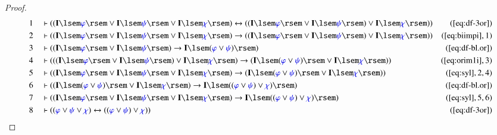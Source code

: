 \begin{proof}
\begin{align}
  1 &&  & \vdash ( ( \mathbf{I} \lsem \mw{\varphi} \rsem \vee \mathbf{I}
      \lsem \mw{\psi} \rsem \vee \mathbf{I} \lsem \mw{\chi} \rsem )
      \leftrightarrow ( ( \mathbf{I} \lsem \mw{\varphi} \rsem \vee
      \mathbf{I} \lsem \mw{\psi} \rsem ) \vee \mathbf{I} \lsem \mw{\chi}
      \rsem ) )&(\mbox{\ref{eq:df-3or}})\notag
  \\ 2 &&  & \vdash ( ( \mathbf{I} \lsem \mw{\varphi} \rsem \vee
      \mathbf{I} \lsem \mw{\psi} \rsem \vee \mathbf{I} \lsem \mw{\chi}
      \rsem ) \rightarrow ( ( \mathbf{I} \lsem \mw{\varphi} \rsem \vee
      \mathbf{I} \lsem \mw{\psi} \rsem ) \vee \mathbf{I} \lsem
      \mw{\chi} \rsem ) )&(\mbox{\ref{eq:biimpi}},1)\notag
  \\ 3 &&  & \vdash ( ( \mathbf{I} \lsem \mw{\varphi} \rsem \vee
      \mathbf{I} \lsem \mw{\psi} \rsem ) \rightarrow \mathbf{I} \lsem (
      \mw{\varphi} \vee \mw{\psi} ) \rsem
      )&(\mbox{\ref{eq:df-bl.or}})\notag
  \\ 4 &&  & \vdash ( ( ( \mathbf{I} \lsem \mw{\varphi} \rsem \vee
      \mathbf{I} \lsem \mw{\psi} \rsem ) \vee \mathbf{I} \lsem
      \mw{\chi} \rsem ) \rightarrow ( \mathbf{I} \lsem ( \mw{\varphi}
      \vee \mw{\psi} ) \rsem \vee \mathbf{I} \lsem \mw{\chi} \rsem )
      )&(\mbox{\ref{eq:orim1i}},3)\notag
  \\ 5 &&  & \vdash ( ( \mathbf{I} \lsem \mw{\varphi} \rsem \vee
      \mathbf{I} \lsem \mw{\psi} \rsem \vee \mathbf{I} \lsem \mw{\chi}
      \rsem ) \rightarrow ( \mathbf{I} \lsem ( \mw{\varphi} \vee
      \mw{\psi} ) \rsem \vee \mathbf{I} \lsem \mw{\chi} \rsem )
      )&(\mbox{\ref{eq:syl}},2,4)\notag
  \\ 6 &&  & \vdash ( ( \mathbf{I} \lsem ( \mw{\varphi} \vee \mw{\psi}
      ) \rsem \vee \mathbf{I} \lsem \mw{\chi} \rsem ) \rightarrow
      \mathbf{I} \lsem ( ( \mw{\varphi} \vee \mw{\psi} ) \vee \mw{\chi}
      ) \rsem )&(\mbox{\ref{eq:df-bl.or}})\notag
  \\ 7 &&  & \vdash ( ( \mathbf{I} \lsem \mw{\varphi} \rsem \vee
      \mathbf{I} \lsem \mw{\psi} \rsem \vee \mathbf{I} \lsem \mw{\chi}
      \rsem ) \rightarrow \mathbf{I} \lsem ( ( \mw{\varphi} \vee
      \mw{\psi} ) \vee \mw{\chi} ) \rsem
      )&(\mbox{\ref{eq:syl}},5,6)\notag
  \\ 8 &&  & \vdash ( ( \mw{\varphi} \vee \mw{\psi} \vee \mw{\chi} )
      \leftrightarrow ( ( \mw{\varphi} \vee \mw{\psi} ) \vee \mw{\chi}
      ) )&(\mbox{\ref{eq:df-3or}})\notag

\end{align}
\end{proof}
